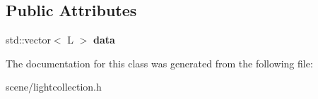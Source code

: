 \subsection*{Public Attributes}
\begin{DoxyCompactItemize}
\item 
\hypertarget{class_tempest_1_1_light_collection_1_1_pack_abac0a48335bd463084e935baab127015}{std\+::vector$<$ L $>$ {\bfseries data}}\label{class_tempest_1_1_light_collection_1_1_pack_abac0a48335bd463084e935baab127015}

\end{DoxyCompactItemize}


The documentation for this class was generated from the following file\+:\begin{DoxyCompactItemize}
\item 
scene/lightcollection.\+h\end{DoxyCompactItemize}
